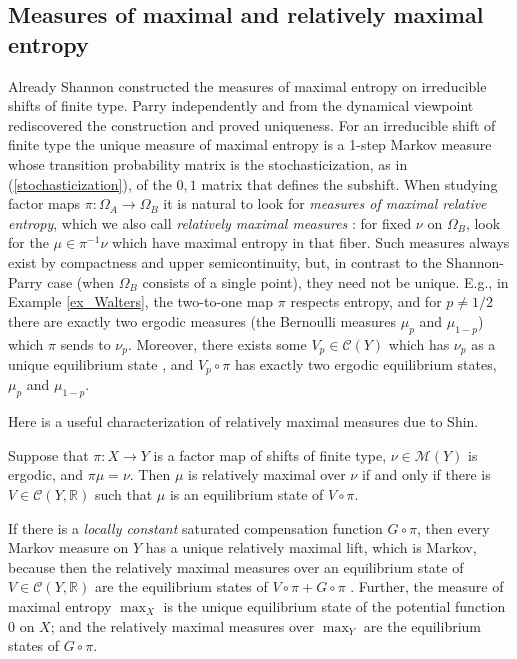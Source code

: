 \documentclass{kepart2010}
\theoremstyle{plain}
\theoremstyle{definition}
\theoremstyle{remark}
\theoremstyle{definition}
\numberwithin{equation}{section}
\begin{document}
\subsection{Measures of maximal and relatively maximal entropy}\label{sec_relmaxent}

Already Shannon \cite{ShannonWeaver1949} constructed the measures of
maximal entropy on irreducible shifts of finite type. Parry
\cite{Parry1964} independently and from the dynamical viewpoint
rediscovered the construction and proved uniqueness. For an
irreducible shift of finite type the unique measure of maximal
entropy is a 1-step Markov measure whose transition probability
matrix is the stochasticization, as in
(\ref{stochasticization}),
of the $0,1$ matrix that defines the subshift. When studying factor
maps $\pi : \Omega_A \to \Omega_B$ it is natural to look for {\em
measures of maximal relative entropy}, which we also call {\em
relatively maximal measures }: for fixed $\nu$ on $\Omega_B$, look
for the $\mu\in\pi^{-1}\nu$ which have {maximal entropy in that
fiber}. Such measures always exist by compactness and upper
semicontinuity, but, in contrast to the Shannon-Parry case (when
$\Omega_B$ consists of a single point), they need not be unique.
E.g., in Example \ref{ex_Walters}, the two-to-one map $\pi$
respects entropy, and for $p\neq 1/2$  there
are exactly two ergodic measures
(the Bernoulli measures $\mu_p$ and $\mu_{1-p}$) which
$\pi$ sends to $\nu_p$. Moreover, there exists some
 $V_p \in {{\mathcal C}}(Y)$ which has $\nu_p$ as a unique equilibrium
state \cite{Israel1979, Phelps2002}, and  $V_p\circ \pi$ has exactly
two {ergodic} equilibrium states,
 $\mu_p$ and $\mu_{1-p}$.

Here is a useful characterization of relatively maximal measures due
to Shin.

\begin{thm}
 Suppose that $\pi :X \to Y$ is a factor map of shifts of finite type,
 $\nu \in {{\mathcal M}}(Y)$ is ergodic, and $\pi \mu = \nu$.
Then $\mu$ is relatively maximal over $\nu$ if and only if there is
$V \in {{\mathcal C}} (Y,{\mathbb R})$ such that $\mu$ is an equilibrium state of $V
\circ \pi$.
\end{thm}

If there is a {\em locally constant} saturated compensation function
$G \circ \pi$, then every {Markov} measure on $Y$ has a unique
relatively maximal lift, which is Markov, because then the
relatively maximal measures over an equilibrium state of $V \in {{\mathcal C}}
(Y,{\mathbb R})$ are the equilibrium states of $V \circ \pi + G \circ \pi$
\cite{Walters1986}.
Further, the measure of maximal entropy $\max_X$ is the unique
equilibrium state of the potential function 0 on $X$; and the
relatively maximal measures over $\max_Y$ are the equilibrium states
of $G \circ \pi$.
\end{document}
